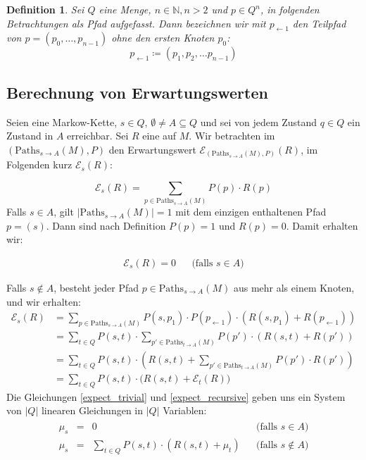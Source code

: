 \documentclass[a4paper]{article}
\newcommand{\mc}{Markow-Kette}
\newtheorem{definition}[satz]{Definition} %
\theoremstyle{nonumberplain}
\begin{document}
\begin{definition}
	Sei $Q$ eine Menge, $n\in \mathbb{N}, n>2$ und $p \in Q^n$, in folgenden Betrachtungen als Pfad aufgefasst. Dann bezeichnen wir mit $p_{\leftarrow 1}$ den Teilpfad von $p = (p_0, \dots, p_{n-1})$ ohne den ersten Knoten $p_0$:
	\begin{equation}
		p_{\leftarrow 1} \coloneqq (p_1,p_2, \dots p_{n-1})
	\end{equation}
\end{definition}

\subsection{Berechnung von Erwartungswerten}

Seien \mcex{} eine \mc{}, $s \in Q$, $\emptyset \neq A \subseteq Q$ und sei von jedem Zustand $q\in Q$ ein Zustand in $A$ erreichbar. Sei $R$ eine \reward{} auf $M$. Wir betrachten im \probspacen{} $(\mathrm{Paths}_{s \rightarrow A}(M), P)$ den Erwartungswert $\mathcal{E}_{(\mathrm{Paths}_{s \rightarrow A}(M), P)}(R)$, im Folgenden kurz $\mathcal{E}_{s}(R)$:

\begin{equation}
	\mathcal{E}_{s}(R) = \sum_{p \in \mathrm{Paths}_{s \rightarrow A}(M)}{P(p) \cdot R(p)} 
\end{equation}
Falls $s \in A$, gilt $|\mathrm{Paths}_{s \rightarrow A}(M)| = 1$ mit dem einzigen enthaltenen Pfad $p = (s)$. Dann sind nach Definition $P(p) = 1$ und $R(p) = 0$. Damit erhalten wir:

\begin{align}
	\mathcal{E}_{s}(R) = 0 && \text{(falls $s \in A$)}\label{expect_trivial}
\end{align}

Falls $s \notin A$, besteht jeder Pfad $p \in \mathrm{Paths}_{s \rightarrow A}(M)$ aus mehr als einem Knoten, und wir erhalten:
\begin{align}
	\mathcal{E}_{s}(R) & = \sum_{p \in \mathrm{Paths}_{s \rightarrow A}(M)}{P(s,p_1) \cdot P(p_{\leftarrow 1}) \cdot (R(s,p_1) + R(p_{\leftarrow 1}))} \\
	& = \sum_{t \in Q}{ P(s,t) \cdot \sum_{p' \in \mathrm{Paths}_{t \rightarrow A}(M)}{ P(p') \cdot (R(s,t) + R(p')) } } \\
	& = \sum_{t \in Q}{ P(s,t) \cdot \left(R(s,t) + \sum_{p' \in \mathrm{Paths}_{t \rightarrow A}(M)}{ P(p') \cdot R(p') } \right) } \\
	& = \sum_{t \in Q}{ P(s,t) \cdot \big(R(s,t) + \mathcal{E}_{t}(R) \big) } \label{expect_recursive}
\end{align}
Die Gleichungen \ref{expect_trivial} und \ref{expect_recursive} geben uns ein System von $|Q|$ linearen Gleichungen in $|Q|$ Variablen:
\begin{align}
\begin{aligned}
	\mu_{s} & = & 0 && \text{(falls $s \in A$)} \\
	\mu_{s} & = & \sum_{t \in Q}{ P(s,t) \cdot \left(R(s,t) + \mu_{t} \right) } && \text{(falls $s \notin A$)}
\end{aligned}\label{les-exp}
\end{align}
\end{document}
